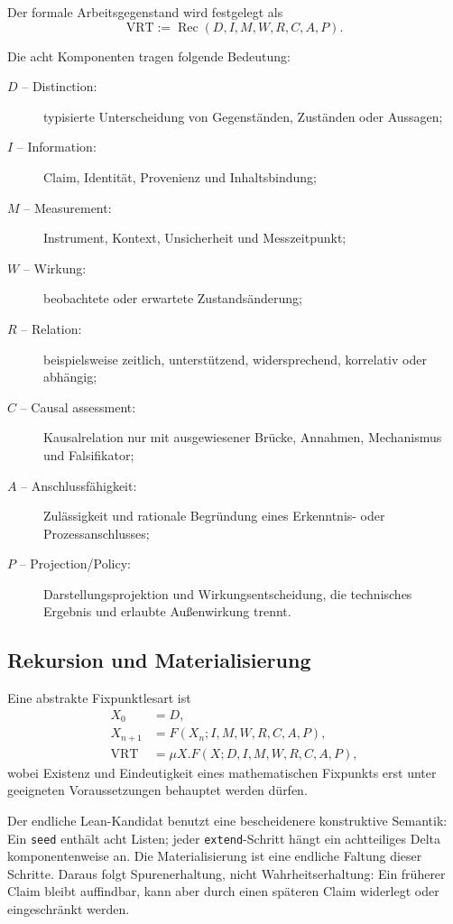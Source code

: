 \documentclass[11pt,a4paper]{article}
\newcommand{\code}[1]{\texttt{#1}}
\begin{document}
Der formale Arbeitsgegenstand wird festgelegt als
\begin{equation}
 \boxed{\mathrm{VRT}:=\operatorname{Rec}(D,I,M,W,R,C,A,P)}.
\end{equation}

Die acht Komponenten tragen folgende Bedeutung:

\begin{description}
  \item[\(D\) -- Distinction:] typisierte Unterscheidung von Gegenständen,
  Zuständen oder Aussagen;
  \item[\(I\) -- Information:] Claim, Identität, Provenienz und
  Inhaltsbindung;
  \item[\(M\) -- Measurement:] Instrument, Kontext, Unsicherheit und
  Messzeitpunkt;
  \item[\(W\) -- Wirkung:] beobachtete oder erwartete Zustandsänderung;
  \item[\(R\) -- Relation:] beispielsweise zeitlich, unterstützend,
  widersprechend, korrelativ oder abhängig;
  \item[\(C\) -- Causal assessment:] Kausalrelation nur mit ausgewiesener
  Brücke, Annahmen, Mechanismus und Falsifikator;
  \item[\(A\) -- Anschlussfähigkeit:] Zulässigkeit und rationale Begründung
  eines Erkenntnis- oder Prozessanschlusses;
  \item[\(P\) -- Projection/Policy:] Darstellungsprojektion und
  Wirkungsentscheidung, die technisches Ergebnis und erlaubte Außenwirkung
  trennt.
\end{description}

\subsection{Rekursion und Materialisierung}

Eine abstrakte Fixpunktlesart ist
\begin{align}
  X_0 &= D,\\
  X_{n+1} &= F(X_n;I,M,W,R,C,A,P),\\
  \mathrm{VRT} &= \mu X.F(X;D,I,M,W,R,C,A,P),
\end{align}
wobei Existenz und Eindeutigkeit eines mathematischen Fixpunkts erst unter
geeigneten Voraussetzungen behauptet werden dürfen.

Der endliche Lean-Kandidat benutzt eine bescheidenere konstruktive Semantik:
Ein \code{seed} enthält acht Listen; jeder \code{extend}-Schritt hängt ein
achtteiliges Delta komponentenweise an. Die Materialisierung ist eine endliche
Faltung dieser Schritte. Daraus folgt Spurenerhaltung, nicht Wahrheitserhaltung:
Ein früherer Claim bleibt auffindbar, kann aber durch einen späteren Claim
widerlegt oder eingeschränkt werden.
\end{document}
